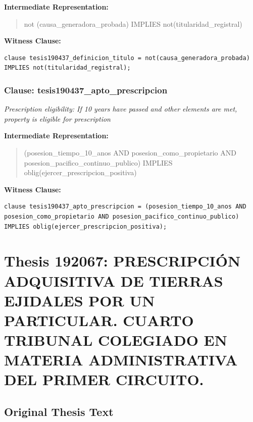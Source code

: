 \documentclass[11pt,a4paper]{article}
\begin{document}
\textbf{Intermediate Representation:}

\begin{quote}
not (causa\_generadora\_probada) IMPLIES not(titularidad\_registral)
\end{quote}

\textbf{Witness Clause:}

\begin{lstlisting}[style=witnessstyle, language=Witness]
clause tesis190437_definicion_titulo = not(causa_generadora_probada) IMPLIES not(titularidad_registral);
\end{lstlisting}

\subsubsection{Clause: tesis190437\_apto\_prescripcion}

\textit{Prescription eligibility: If 10 years have passed and other elements are met, property is eligible for prescription}

\textbf{Intermediate Representation:}

\begin{quote}
(posesion\_tiempo\_10\_anos AND posesion\_como\_propietario AND posesion\_pacifico\_continuo\_publico) IMPLIES oblig(ejercer\_prescripcion\_positiva)
\end{quote}

\textbf{Witness Clause:}

\begin{lstlisting}[style=witnessstyle, language=Witness]
clause tesis190437_apto_prescripcion = (posesion_tiempo_10_anos AND posesion_como_propietario AND posesion_pacifico_continuo_publico) IMPLIES oblig(ejercer_prescripcion_positiva);
\end{lstlisting}

\newpage

\section{Thesis 192067: PRESCRIPCIÓN ADQUISITIVA DE TIERRAS EJIDALES POR UN PARTICULAR. CUARTO TRIBUNAL COLEGIADO EN MATERIA ADMINISTRATIVA DEL PRIMER CIRCUITO.}
\label{thesis:192067}

\subsection{Original Thesis Text}
\end{document}
